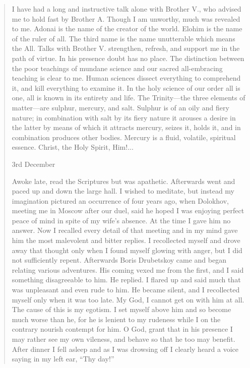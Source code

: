 \begin{quote} \calli

I have had a long and instructive talk alone with Brother V., who
advised me to hold fast by Brother A. Though I am unworthy, much
was revealed to me. Adonai is the name of the creator of the
world. Elohim is the name of the ruler of all. The third name is
the name unutterable which means the All. Talks with Brother
V. strengthen, refresh, and support me in the path of virtue. In
his presence doubt has no place.  The distinction between the
poor teachings of mundane science and our sacred all-embracing
teaching is clear to me. Human sciences dissect everything to
comprehend it, and kill everything to examine it. In the holy
science of our order all is one, all is known in its entirety and
life. The Trinity---the three elements of matter---are sulphur,
mercury, and salt. Sulphur is of an oily and fiery nature; in
combination with salt by its fiery nature it arouses a desire in
the latter by means of which it attracts mercury, seizes it,
holds it, and in combination produces other bodies. Mercury is a
fluid, volatile, spiritual essence.  Christ, the Holy Spirit,
Him!...

3rd December

Awoke late, read the Scriptures but was apathetic. Afterwards
went and paced up and down the large hall. I wished to meditate,
but instead my imagination pictured an occurrence of four years
ago, when Dolokhov, meeting me in Moscow after our duel, said he
hoped I was enjoying perfect peace of mind in spite of my wife's
absence. At the time I gave him no answer. Now I recalled every
detail of that meeting and in my mind gave him the most
malevolent and bitter replies. I recollected myself and drove
away that thought only when I found myself glowing with anger,
but I did not sufficiently repent. Afterwards Boris Drubetskoy
came and began relating various adventures. His coming vexed me
from the first, and I said something disagreeable to him. He
replied. I flared up and said much that was unpleasant and even
rude to him. He became silent, and I recollected myself only when
it was too late. My God, I cannot get on with him at all. The
cause of this is my egotism. I set myself above him and so become
much worse than he, for he is lenient to my rudeness while I on
the contrary nourish contempt for him. O God, grant that in his
presence I may rather see my own vileness, and behave so that he
too may benefit. After dinner I fell asleep and as I was drowsing
off I clearly heard a voice saying in my left ear, ``Thy day!''


\end{quote}
